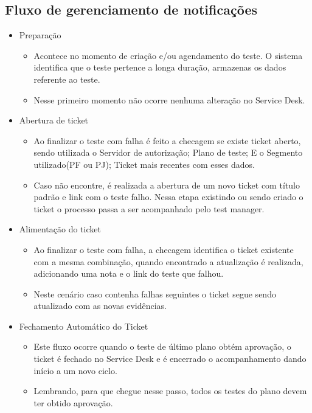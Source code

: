 \subsection{Fluxo de gerenciamento de notificações}
\begin{itemize}
    \item Preparação 
    \begin{itemize}
        \item Acontece no momento de criação e/ou agendamento do teste. O sistema identifica que o teste pertence a longa duração, armazenas os dados referente ao teste.
        \item Nesse primeiro momento não ocorre nenhuma alteração no Service Desk.
    \end{itemize}
    \item Abertura de ticket
    \begin{itemize}
        \item Ao finalizar o teste com falha é feito a checagem se existe ticket aberto, sendo utilizada o Servidor de autorização; Plano de teste; E o Segmento utilizado(PF ou PJ); Ticket mais recentes com esses dados. 
        \item Caso não encontre, é realizada a abertura de um novo ticket com título padrão e link com o teste falho. 
    Nessa etapa existindo ou sendo criado o ticket o processo passa a ser acompanhado pelo test manager.
    \end{itemize}
 
    \item Alimentação do ticket
        \begin{itemize}
            \item Ao finalizar o teste com falha, a checagem identifica o ticket existente com a mesma combinação, quando encontrado a atualização é realizada, adicionando uma nota e o link do teste que falhou. 
            \item Neste cenário caso contenha falhas seguintes o ticket segue sendo atualizado com as novas evidências.
        \end{itemize}
    \item Fechamento Automático do Ticket
        \begin{itemize}
            \item  Este fluxo ocorre quando o teste de último plano obtém aprovação, o ticket é fechado no Service Desk e é encerrado o acompanhamento dando início a um novo ciclo. 
            \item Lembrando, para que chegue nesse passo, todos os testes do plano devem ter obtido aprovação.
        \end{itemize}

\end{itemize}

